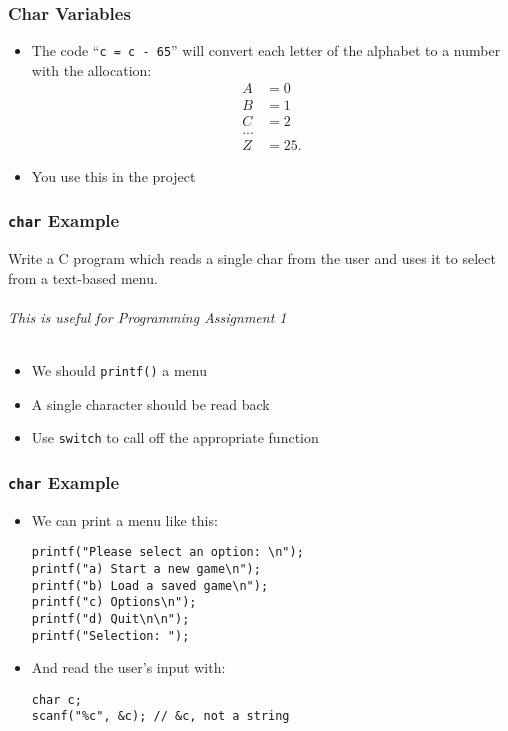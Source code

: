 \documentclass[14pt]{beamer}
\begin{document}
\begin{frame}
\frametitle{Char Variables}
\begin{itemize}
\item The code ``\texttt{c = c - 65}'' will convert each letter of the alphabet to a number with the allocation:
\begin{align*}
A&=0\\
B&=1\\
C&=2\\
 ...\\
Z&=25.
\end{align*}
\pause
\vspace{-5mm}
\item You use this in the project
\end{itemize}
\end{frame}

\begin{frame}
\frametitle{\texttt{char} Example}
Write a C program which reads a single char from the user and uses it to select from a text-based menu.\\
~\\
\textit{This is useful for Programming Assignment 1}\\
~\\
\pause
\begin{itemize}
\item We should \texttt{printf()} a menu
\item A single character should be read back
\item Use \texttt{switch} to call off the appropriate function
\end{itemize}
\end{frame}

\begin{frame}[fragile]
\frametitle{\texttt{char} Example}
\begin{itemize}
\item We can print a menu like this:
\begin{lstlisting}[style=CStyle]
printf("Please select an option: \n");
printf("a) Start a new game\n");
printf("b) Load a saved game\n");
printf("c) Options\n");
printf("d) Quit\n\n");
printf("Selection: ");
\end{lstlisting}
\pause
\item And read the user's input with:
\begin{lstlisting}[style=CStyle]
char c;
scanf("%c", &c); // &c, not a string
\end{lstlisting}
\end{itemize}
\end{frame}
\end{document}
